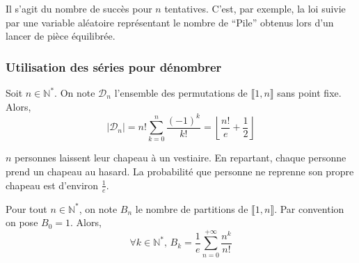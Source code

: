   \begin{remark}
    Il s'agit du nombre de succès pour $n$ tentatives.
    \newpar
    C'est, par exemple, la loi suivie par une variable aléatoire représentant le nombre de ``Pile'' obtenus lors d'un lancer de pièce équilibrée.
  \end{remark}

  \subsubsection{Utilisation des séries pour dénombrer}


  \begin{theorem}[Dérangements]
    Soit $n \in \mathbb{N}^*$. On note $\mathcal{D}_n$ l'ensemble des permutations de $\llbracket 1, n \rrbracket$ sans point fixe. Alors,
    \[ \vert \mathcal{D}_n \vert = n! \sum_{k=0}^{n} \frac{(-1)^k}{k!} = \left\lfloor \frac{n!}{e} + \frac{1}{2} \right\rfloor \]
  \end{theorem}

  \begin{example}
    $n$ personnes laissent leur chapeau à un vestiaire. En repartant, chaque personne prend un chapeau au hasard. La probabilité que personne ne reprenne son propre chapeau est d'environ $\frac{1}{e}$.
  \end{example}


  \begin{theorem}
    Pour tout $n \in \mathbb{N}^*$, on note $B_n$ le nombre de partitions de $\llbracket 1, n \rrbracket$. Par convention on pose $B_0 = 1$. Alors,
    \[ \forall k \in \mathbb{N}^*, \, B_k = \frac{1}{e} \sum_{n=0}^{+\infty} \frac{n^k}{n!} \]
  \end{theorem}

